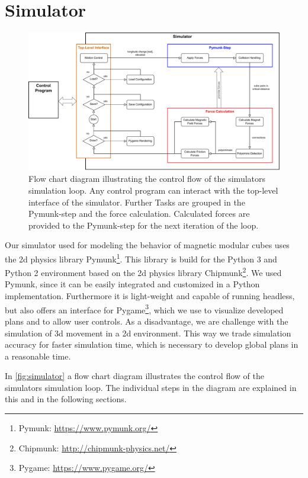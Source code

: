 \chapter{Simulator}
\label{chap:sim}

\begin{figure}
	\centering
	\includegraphics[width=1\textwidth]{figures/simulator_controlflow.pdf}
	\caption[Control flow of the simulator]{Flow chart diagram illustrating the control flow of the simulators simulation loop. Any control program can interact with the top-level interface of the simulator. Further Tasks are grouped in the Pymunk-step and the force calculation. Calculated forces are provided to the Pymunk-step for the next iteration of the loop.}
	\label{fig:simulator}
\end{figure}

Our simulator used for modeling the behavior of magnetic modular cubes uses the 2d physics library Pymunk\footnote{Pymunk: \url{https://www.pymunk.org/}}.
This library is build for the Python 3 and Python 2 environment based on the 2d physics library Chipmunk\footnote{Chipmunk: \url{http://chipmunk-physics.net/}}.
We used Pymunk, since it can be easily integrated and customized in a Python implementation.
Furthermore it is light-weight and capable of running headless, but also offers an interface for Pygame\footnote{Pygame: \url{https://www.pygame.org/}}, which we use to visualize developed plans and to allow user controls.
As a disadvantage, we are challenge with the simulation of 3d movement in a 2d environment.
This way we trade simulation accuracy for faster simulation time, which is necessary to develop global plans in a reasonable time.

In \autoref{fig:simulator} a flow chart diagram illustrates the control flow of the simulators simulation loop.
The individual steps in the diagram are explained in this and in the following sections.

